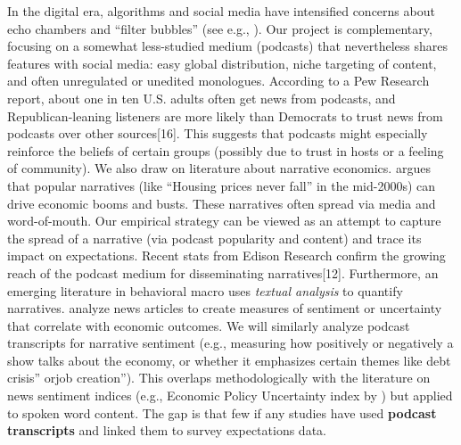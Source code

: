 \documentclass[12pt]{article}
\begin{document}
In the digital era, algorithms and social media have intensified concerns about echo chambers and ``filter bubbles'' (see e.g., \citealp{Sunstein2001}). Our project is complementary, focusing on a somewhat less-studied medium (podcasts) that nevertheless shares features with social media: easy global distribution, niche targeting of content, and often unregulated or unedited monologues. According to a Pew Research report, about one in ten U.S. adults often get news from podcasts, and Republican-leaning listeners are more likely than Democrats to trust news from podcasts over other sources[16]. This suggests that podcasts might especially reinforce the beliefs of certain groups (possibly due to trust in hosts or a feeling of community).
We also draw on literature about narrative economics. \citet{Shiller2017narrative} argues that popular narratives (like ``Housing prices never fall'' in the mid-2000s) can drive economic booms and busts. These narratives often spread via media and word-of-mouth. Our empirical strategy can be viewed as an attempt to capture the spread of a narrative (via podcast popularity and content) and trace its impact on expectations. Recent stats from Edison Research confirm the growing reach of the podcast medium for disseminating narratives[12].
Furthermore, an emerging literature in behavioral macro uses \emph{textual analysis} to quantify narratives. \citet{Shapiro2020news} analyze news articles to create measures of sentiment or uncertainty that correlate with economic outcomes. We will similarly analyze podcast transcripts for narrative sentiment (e.g., measuring how positively or negatively a show talks about the economy, or whether it emphasizes certain themes like debt crisis'' orjob creation''). This overlaps methodologically with the literature on news sentiment indices (e.g., Economic Policy Uncertainty index by \citealt{BakerBloomDavis2016}) but applied to spoken word content. The gap is that few if any studies have used \textbf{podcast transcripts} and linked them to survey expectations data.
\end{document}
